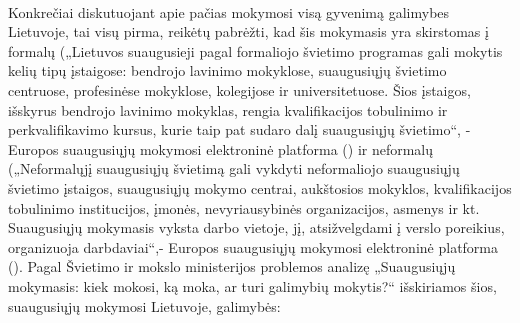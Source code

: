 \documentclass[12pt,a4paper, titlepage]{article}
\begin{document}
\paragraph{}
	Konkrečiai diskutuojant apie pačias mokymosi visą gyvenimą galimybes Lietuvoje, tai visų pirma, reikėtų pabrėžti, kad šis mokymasis yra skirstomas į formalų („Lietuvos suaugusieji pagal formaliojo švietimo programas gali mokytis kelių tipų įstaigose: bendrojo lavinimo mokyklose, suaugusiųjų švietimo centruose, profesinėse mokyklose, kolegijose ir universitetuose. Šios įstaigos, išskyrus bendrojo lavinimo mokyklas, rengia kvalifikacijos tobulinimo ir perkvalifikavimo kursus, kurie taip pat sudaro dalį suaugusiųjų švietimo“, - Europos suaugusiųjų mokymosi elektroninė platforma (\cite{shpitzer_2019}) ir neformalų („Neformalųjį suaugusiųjų švietimą gali vykdyti neformaliojo suaugusiųjų švietimo įstaigos, suaugusiųjų mokymo centrai, aukštosios mokyklos, kvalifikacijos tobulinimo institucijos, įmonės, nevyriausybinės organizacijos, asmenys ir kt. Suaugusiųjų mokymasis vyksta darbo vietoje, jį, atsižvelgdami į verslo poreikius, organizuoja darbdaviai“,- Europos suaugusiųjų mokymosi elektroninė platforma (\cite{shpitzer_2019}).  Pagal Švietimo ir mokslo ministerijos problemos analizę „Suaugusiųjų mokymasis: kiek mokosi, ką moka, ar turi galimybių mokytis?“ išskiriamos šios, suaugusiųjų mokymosi Lietuvoje, galimybės: 
\end{document}

